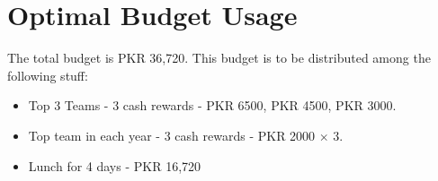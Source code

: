 \documentclass[12pt]{article}
\begin{document}
\section*{\centering Optimal Budget Usage}
The total budget is PKR 36,720.
This budget is to be distributed among the following stuff:
\begin{itemize}
\item Top 3 Teams - 3 cash rewards - PKR 6500, PKR 4500, PKR 3000.
\item Top team in each year - 3 cash rewards - PKR 2000 $\times$ 3.
\item Lunch for 4 days - PKR 16,720
\end{itemize}
\end{document}
